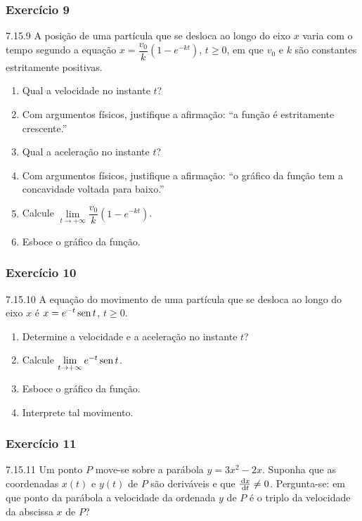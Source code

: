 \subsubsection*{Exercício 9}
\begin{exercicio}[9]{7.15.9}
A posição de uma partícula que se desloca ao longo do eixo $x$ varia com o tempo segundo a equação $x = \dfrac{v_0}{k}(1 - e^{-kt})$, $t \ge 0$, em que $v_0$ e $k$ são constantes estritamente positivas.
\begin{enumerate}[label=\alph*)]
    \item Qual a velocidade no instante $t$?
    \item Com argumentos físicos, justifique a afirmação: ``a função é estritamente crescente.''
    \item Qual a aceleração no instante $t$?
    \item Com argumentos físicos, justifique a afirmação: ``o gráfico da função tem a concavidade voltada para baixo.''
    \item Calcule $\lim\limits_{t \to +\infty} \dfrac{v_0}{k}(1 - e^{-kt})$.
    \item Esboce o gráfico da função.
\end{enumerate}
\end{exercicio}

\subsubsection*{Exercício 10}
\begin{exercicio}[10]{7.15.10}
A equação do movimento de uma partícula que se desloca ao longo do eixo $x$ é $x = e^{-t}\operatorname{sen} t$, $t \ge 0$.
\begin{enumerate}[label=\alph*)]
    \item Determine a velocidade e a aceleração no instante $t$?
    \item Calcule $\lim\limits_{t \to +\infty} e^{-t}\operatorname{sen} t$.
    \item Esboce o gráfico da função.
    \item Interprete tal movimento.
\end{enumerate}
\end{exercicio}

\subsubsection*{Exercício 11}
\begin{exercicio}[11]{7.15.11}
Um ponto $P$ move-se sobre a parábola $y = 3x^2 - 2x$. Suponha que as coordenadas $x(t)$ e $y(t)$ de $P$ são deriváveis e que $\frac{\,\mathrm{d} x}{\,\mathrm{d} t} \neq 0$. Pergunta-se: em que ponto da parábola a velocidade da ordenada $y$ de $P$ é o triplo da velocidade da abscissa $x$ de $P$?
\end{exercicio}

